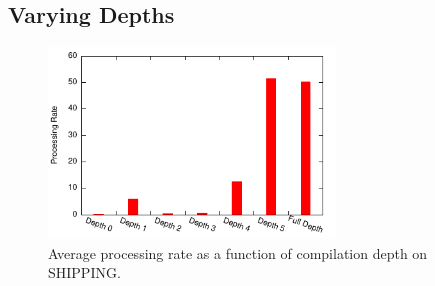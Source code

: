 \subsection{Varying Depths}
\begin{figure}
\begin{center}
\includegraphics[width=3in]{../graphs/graphs/depth_ssb4.pdf}
\caption{Average processing rate as a function of compilation depth on SHIPPING.}
\label{fig:experiments:ssb4depth}
\end{center}
\end{figure}


\begin{figure}
\begin{center}

\end{center}
\end{figure}